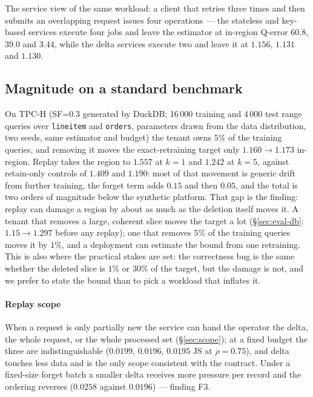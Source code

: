 \documentclass[conference]{IEEEtran}
\begin{document}
The service view of the same workload: a client that retries three times and then submits an
overlapping request issues four operations --- the stateless and key-based services execute four
jobs and leave the estimator at in-region Q-error $60.8$, $39.0$ and $3.44$, while the delta
services execute two and leave it at $1.156$, $1.131$ and $1.130$.

\subsection{Magnitude on a standard benchmark}
\label{sec:eval-tpch}
On TPC-H (SF=0.3 generated by DuckDB; 16\,000 training and 4\,000 test range queries over
\texttt{lineitem} and \texttt{orders}, parameters drawn from the data distribution, two seeds,
same estimator and budget) the tenant owns $5\%$ of the training queries, and removing it moves
the exact-retraining target only $1.160\to1.173$ in-region.  Replay takes the region to $1.557$
at $k=1$ and $1.242$ at $k=5$, against retain-only controls of $1.409$ and $1.190$: most of that
movement is generic drift from further training, the forget term adds $0.15$ and then $0.05$, and
the total is two orders of magnitude below the synthetic platform.  That gap is the finding:
replay can damage a region by about as much as the deletion itself moves it.  A tenant that
removes a large, coherent slice moves the target a lot (\S\ref{sec:eval-db}: $1.15\to1.297$
before any replay); one that removes $5\%$ of the training queries moves it by $1\%$, and a
deployment can estimate the bound from one retraining.  This is also where the practical stakes
are set: the correctness bug is the same whether the deleted slice is $1\%$ or $30\%$ of the
target, but the damage is not, and we prefer to state the bound than to pick a workload that
inflates it.

\paragraph{Replay scope}
When a request is only partially new the service can hand the operator the delta, the whole
request, or the whole processed set (\S\ref{sec:scope}); at a fixed budget the three are
indistinguishable ($0.0199$, $0.0196$, $0.0195$ JS at $\rho=0.75$), and delta touches less data
and is the only scope consistent with the contract.  Under a fixed-size forget batch a smaller
delta receives more pressure per record and the ordering reverses ($0.0258$ against $0.0196$)
--- finding F3.
\end{document}
